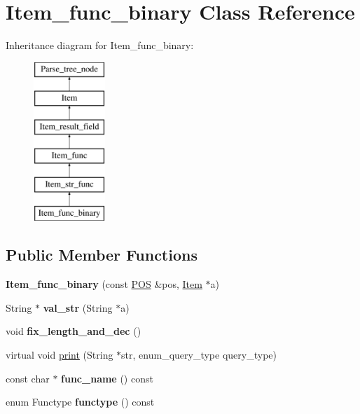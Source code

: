 \hypertarget{classItem__func__binary}{}\section{Item\+\_\+func\+\_\+binary Class Reference}
\label{classItem__func__binary}
Inheritance diagram for Item\+\_\+func\+\_\+binary\+:\begin{figure}[H]
\begin{center}
\leavevmode
\includegraphics[height=6.000000cm]{classItem__func__binary}
\end{center}
\end{figure}
\subsection*{Public Member Functions}
\begin{DoxyCompactItemize}
\item 
\mbox{\label{classItem__func__binary_ab9d265f7b89ea1fa33c4cf9315c80a5e}} 
{\bfseries Item\+\_\+func\+\_\+binary} (const \mbox{\hyperlink{structYYLTYPE}{P\+OS}} \&pos, \mbox{\hyperlink{classItem}{Item}} $\ast$a)
\item 
\mbox{\label{classItem__func__binary_ac8a1b648346c2fab5d16e4ebd1ee9301}} 
String $\ast$ {\bfseries val\+\_\+str} (String $\ast$a)
\item 
\mbox{\label{classItem__func__binary_a3911c4d375621f90d44d0478e468d621}} 
void {\bfseries fix\+\_\+length\+\_\+and\+\_\+dec} ()
\item 
virtual void \mbox{\hyperlink{classItem__func__binary_a844fa037571955cec5ce1a8d64eb33c1}{print}} (String $\ast$str, enum\+\_\+query\+\_\+type query\+\_\+type)
\item 
\mbox{\label{classItem__func__binary_a9bb4cd425ae71ee48493b5a4e5dfb992}} 
const char $\ast$ {\bfseries func\+\_\+name} () const
\item 
\mbox{\label{classItem__func__binary_a06362295e0888dc261fef0d075f57124}} 
enum Functype {\bfseries functype} () const
\end{DoxyCompactItemize}
